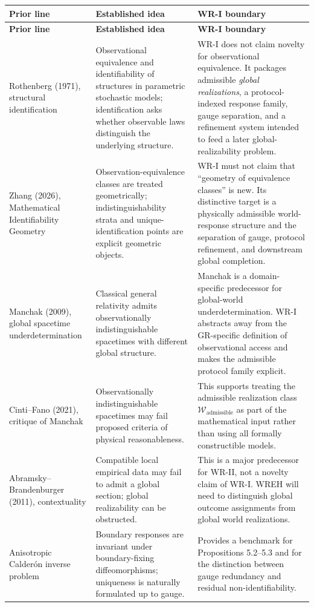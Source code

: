 \documentclass[11pt]{article}
\newcommand{\W}{\mathcal W}
\begin{document}
\begin{longtable}{>{\raggedright\arraybackslash}p{}
                  >{\raggedright\arraybackslash}p{}
                  >{\raggedright\arraybackslash}p{}}
\toprule
\textbf{Prior line} & \textbf{Established idea} & \textbf{WR-I boundary} \\
\midrule
\endfirsthead
\toprule
\textbf{Prior line} & \textbf{Established idea} & \textbf{WR-I boundary} \\
\midrule
\endhead

Rothenberg (1971), structural identification &
Observational equivalence and identifiability of structures in parametric
stochastic models; identification asks whether observable laws distinguish the
underlying structure. &
WR-I does not claim novelty for observational equivalence.  It packages
admissible \emph{global realizations}, a protocol-indexed response family,
gauge separation, and a refinement system intended to feed a later
global-realizability problem. \\[6pt]

Zhang (2026), Mathematical Identifiability Geometry &
Observation-equivalence classes are treated geometrically; indistinguishability
strata and unique-identification points are explicit geometric objects. &
WR-I must not claim that ``geometry of equivalence classes'' is new.  Its
distinctive target is a physically admissible world-response structure and the
separation of gauge, protocol refinement, and downstream global completion. \\[6pt]

Manchak (2009), global spacetime underdetermination &
Classical general relativity admits observationally indistinguishable
spacetimes with different global structure. &
Manchak is a domain-specific predecessor for global-world
underdetermination.  WR-I abstracts away from the GR-specific definition of
observational access and makes the admissible protocol family explicit. \\[6pt]

Cinti--Fano (2021), critique of Manchak &
Observationally indistinguishable spacetimes may fail proposed criteria of
physical reasonableness. &
This supports treating the admissible realization class
$\W_{\mathrm{admissible}}$ as part of the mathematical input rather than using
all formally constructible models. \\[6pt]

Abramsky--Brandenburger (2011), contextuality &
Compatible local empirical data may fail to admit a global section; global
realizability can be obstructed. &
This is a major predecessor for WR-II, not a novelty claim of WR-I.  WREH will
need to distinguish global outcome assignments from global world
realizations. \\[6pt]

Anisotropic Calderón inverse problem &
Boundary responses are invariant under boundary-fixing diffeomorphisms;
uniqueness is naturally formulated up to gauge. &
Provides a benchmark for Propositions 5.2--5.3 and for the distinction between
gauge redundancy and residual non-identifiability. \\
\bottomrule
\end{longtable}
\end{document}
